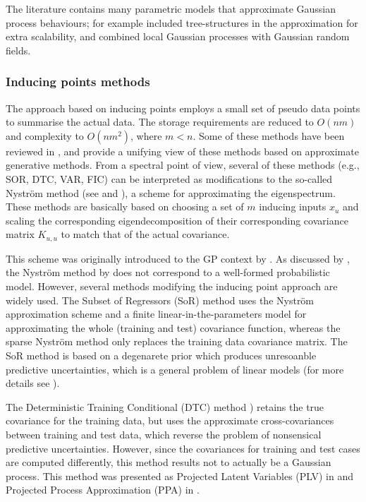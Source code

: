 \documentclass[]{interact}
\theoremstyle{plain}%
\theoremstyle{definition}
\theoremstyle{remark}
\begin{document}
The literature contains many parametric models that approximate Gaussian process behaviours; for example \cite{bui2014tree} included  tree-structures in the approximation for extra scalability, and \cite{moore2015gaussian} combined local Gaussian
processes with Gaussian random fields.

\subsubsection{Inducing points methods}

The approach based on inducing points employs a small set of pseudo data points to summarise the actual data. The storage requirements are reduced to $O(nm)$ and complexity to $O(nm^2)$, where $m < n$. Some of these methods have been reviewed in \cite{rasmussen2006gaussian}, and \cite{quinonero2005unifying} provide a unifying view of these methods based on approximate generative methods. From a spectral point of view, several of these methods (e.g., SOR, DTC, VAR, FIC) can be interpreted as modiﬁcations to the so-called Nystr\"om method (see \cite{arthur1979baker} and \cite{williams2001using}), a scheme for approximating the eigenspectrum. These methods are basically based on choosing a set of $m$ inducing inputs $x_u$ and scaling the corresponding eigendecomposition of their corresponding covariance matrix $K_{u,u}$ to match that of the actual covariance. 

This scheme was originally introduced to the GP context by \cite{williams2001using}. As discussed by \cite{quinonero2005unifying}, the Nystr\"om method by \cite{williams2001using} does not correspond to a well-formed probabilistic model. However, several methods modifying the inducing point approach are widely used. The Subset of Regressors (SoR) \citep{smola2001sparse} method uses the Nystr\"om approximation scheme and a finite linear-in-the-parameters model for approximating the whole (training and test) covariance function, whereas the sparse Nystr\"om method \citep{williams2001using} only replaces the training data covariance matrix. The SoR method is based on a degenarete prior which produces unresoanble predictive uncertainties, which is a general problem of linear models (for more details see \cite{rasmussen2006gaussian}). 

The Deterministic Training Conditional (DTC) method \citep{ro2001sparse,seeger2003fast}) retains the true covariance for the training data, but uses the approximate cross-covariances between training and test data, which reverse the problem of nonsensical predictive uncertainties. However, since the covariances for training and test cases are computed differently, this method results not to actually be a Gaussian process. This method was presented as Projected Latent Variables (PLV) in \cite{seeger2003fast} and Projected Process Approximation (PPA) in \cite{rasmussen2006gaussian}. 
\end{document}
